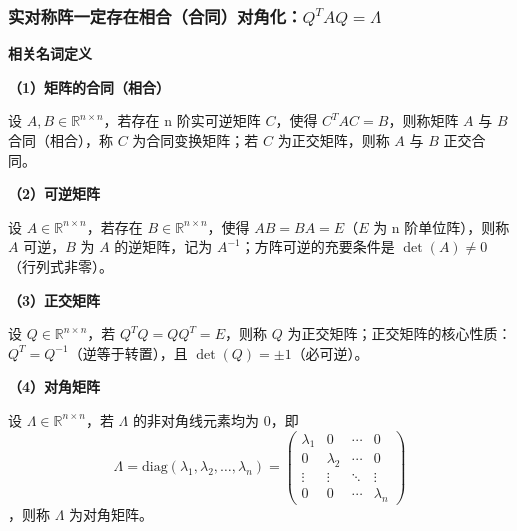 \documentclass[10pt]{article}
\numberwithin{equation}{section}
\theoremstyle{plain}
\theoremstyle{definition}
\theoremstyle{remark}
\newcommand{\R}{\mathbb{R}}
\begin{document}
\subsubsection{实对称阵一定存在相合（合同）对角化：$Q^T AQ=\Lambda$}

{\par\vspace{0.8ex}\noindent\normalsize\bfseries\color{secblue} 相关名词定义\par}

{\par\vspace{0.8ex}\noindent\normalsize\bfseries\color{secblue} （1）矩阵的合同（相合）\par}

设 $A,B\in\R^{n\times n}$，若存在 n 阶实可逆矩阵 $C$，使得 $C^T AC=B$，则称矩阵 $A$ 与 $B$ 合同（相合），称 $C$ 为合同变换矩阵；若 $C$ 为正交矩阵，则称 $A$ 与 $B$ 正交合同。

{\par\vspace{0.8ex}\noindent\normalsize\bfseries\color{secblue} （2）可逆矩阵\par}

设 $A\in\R^{n\times n}$，若存在 $B\in\R^{n\times n}$，使得 $AB=BA=E$（$E$ 为 n 阶单位阵），则称 $A$ 可逆，$B$ 为 $A$ 的逆矩阵，记为 $A^{-1}$；方阵可逆的充要条件是 $\det(A)\neq 0$（行列式非零）。

{\par\vspace{0.8ex}\noindent\normalsize\bfseries\color{secblue} （3）正交矩阵\par}

设 $Q\in\R^{n\times n}$，若 $Q^T Q=QQ^T =E$，则称 $Q$ 为正交矩阵；正交矩阵的核心性质：$Q^T=Q^{-1}$（逆等于转置），且 $\det(Q)=\pm 1$（必可逆）。

{\par\vspace{0.8ex}\noindent\normalsize\bfseries\color{secblue} （4）对角矩阵\par}

设 $\Lambda\in\R^{n\times n}$，若 $\Lambda$ 的非对角线元素均为 0，即 \[\Lambda=\text{diag}(\lambda_1,\lambda_2,\ldots,\lambda_n)=\begin{pmatrix}\lambda_1 & 0 & \cdots & 0\\ 0 & \lambda_2 & \cdots & 0\\ \vdots & \vdots & \ddots & \vdots\\ 0 & 0 & \cdots & \lambda_n\end{pmatrix}\]，则称 $\Lambda$ 为对角矩阵。
\end{document}
